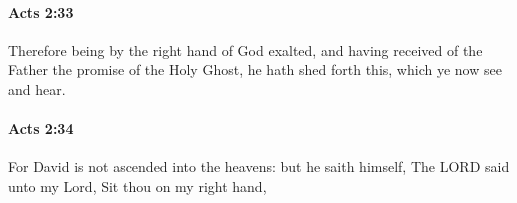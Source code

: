 		\paragraph{Acts 2:33} %
			\label{ACTS-2-33}

			Therefore being by the right hand of God exalted, and having received of the Father the promise of the Holy Ghost, he hath shed forth this, which ye now see and hear.

			\begin{framed}
			\scriptsize
				\begin{compactdesc}
					\item[SBLG] 
				\end{compactdesc}
			\end{framed}

		\paragraph{Acts 2:34} %
			\label{ACTS-2-34}

			For David is not ascended into the heavens: but he saith himself, The LORD said unto my Lord, Sit thou on my right hand,

